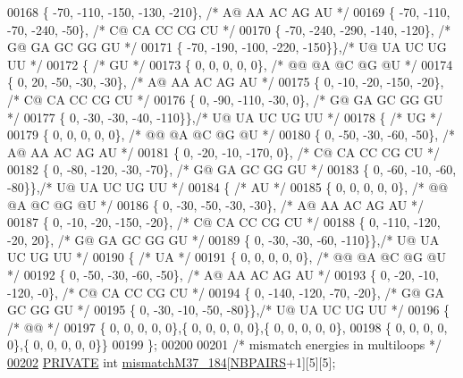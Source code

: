 \begin{DoxyCode}
00168    \{ -70, -110, -150, -130, -210\}, \textcolor{comment}{/* A@  AA  AC  AG  AU */}
00169    \{ -70, -110,  -70, -240,  -50\}, \textcolor{comment}{/* C@  CA  CC  CG  CU */}
00170    \{ -70, -240, -290, -140, -120\}, \textcolor{comment}{/* G@  GA  GC  GG  GU */}
00171    \{ -70, -190, -100, -220, -150\}\},\textcolor{comment}{/* U@  UA  UC  UG  UU */}
00172   \{ \textcolor{comment}{/* GU */}
00173    \{   0,    0,    0,    0,    0\}, \textcolor{comment}{/* @@  @A  @C  @G  @U */}
00174    \{   0,   20,  -50,  -30,  -30\}, \textcolor{comment}{/* A@  AA  AC  AG  AU */}
00175    \{   0,  -10,  -20, -150,  -20\}, \textcolor{comment}{/* C@  CA  CC  CG  CU */}
00176    \{   0,  -90, -110,  -30,    0\}, \textcolor{comment}{/* G@  GA  GC  GG  GU */}
00177    \{   0,  -30,  -30,  -40, -110\}\},\textcolor{comment}{/* U@  UA  UC  UG  UU */}
00178   \{ \textcolor{comment}{/* UG */}
00179    \{   0,    0,    0,    0,    0\}, \textcolor{comment}{/* @@  @A  @C  @G  @U */}
00180    \{   0,  -50,  -30,  -60,  -50\}, \textcolor{comment}{/* A@  AA  AC  AG  AU */}
00181    \{   0,  -20,  -10, -170,    0\}, \textcolor{comment}{/* C@  CA  CC  CG  CU */}
00182    \{   0,  -80, -120,  -30,  -70\}, \textcolor{comment}{/* G@  GA  GC  GG  GU */}
00183    \{   0,  -60,  -10,  -60,  -80\}\},\textcolor{comment}{/* U@  UA  UC  UG  UU */}
00184   \{ \textcolor{comment}{/* AU */}
00185    \{   0,    0,    0,    0,    0\}, \textcolor{comment}{/* @@  @A  @C  @G  @U */}
00186    \{   0,  -30,  -50,  -30,  -30\}, \textcolor{comment}{/* A@  AA  AC  AG  AU */}
00187    \{   0,  -10,  -20, -150,  -20\}, \textcolor{comment}{/* C@  CA  CC  CG  CU */}
00188    \{   0, -110, -120,  -20,   20\}, \textcolor{comment}{/* G@  GA  GC  GG  GU */}
00189    \{   0,  -30,  -30,  -60, -110\}\},\textcolor{comment}{/* U@  UA  UC  UG  UU */}
00190   \{ \textcolor{comment}{/* UA */}
00191    \{   0,    0,    0,    0,    0\}, \textcolor{comment}{/* @@  @A  @C  @G  @U */}
00192    \{   0,  -50,  -30,  -60,  -50\}, \textcolor{comment}{/* A@  AA  AC  AG  AU */}
00193    \{   0,  -20,  -10, -120,   -0\}, \textcolor{comment}{/* C@  CA  CC  CG  CU */}
00194    \{   0, -140, -120,  -70,  -20\}, \textcolor{comment}{/* G@  GA  GC  GG  GU */}
00195    \{   0,  -30,  -10,  -50,  -80\}\},\textcolor{comment}{/* U@  UA  UC  UG  UU */}
00196   \{ \textcolor{comment}{/* @@ */}
00197    \{  0,  0,  0,  0,  0\},\{  0,  0,  0,  0,  0\},\{  0,  0,  0,  0,  0\},
00198    \{  0,  0,  0,  0,  0\},\{  0,  0,  0,  0,  0\}\}
00199 \};
00200 
00201 \textcolor{comment}{/* mismatch energies in multiloops */}
\mbox{\hyperlink{1_88_84__epars_8h_a1309d70454ad5ccbc1ef1d2eafdbc928}{00202}} \mbox{\hyperlink{edit__cost_8h_a5e151c615eda34903514212f05a5ccf8}{PRIVATE}} \textcolor{keywordtype}{int} \mbox{\hyperlink{1_88_84__epars_8h_a1309d70454ad5ccbc1ef1d2eafdbc928}{mismatchM37\_184}}[\mbox{\hyperlink{1_88_84__epars_8h_a5e75221c779d618eab81e096f37e32ce}{NBPAIRS}}+1][5][5];

\end{DoxyCode}
